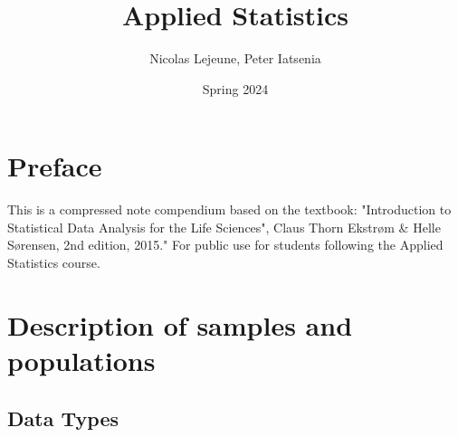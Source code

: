 \documentclass{article}
\title{Applied Statistics}
\author{Nicolas Lejeune, Peter Iatsenia}
\date{Spring 2024}
\begin{document}
\maketitle

\tableofcontents

\pagebreak

\section*{Preface}
This is a compressed note compendium based on the textbook: "Introduction to Statistical Data Analysis for the Life Sciences", Claus Thorn Ekstrøm \& Helle Sørensen, 2nd edition, 2015." For public use for students following the Applied Statistics course.

\section{Description of samples and populations}

\subsection{Data Types}
\end{document}

